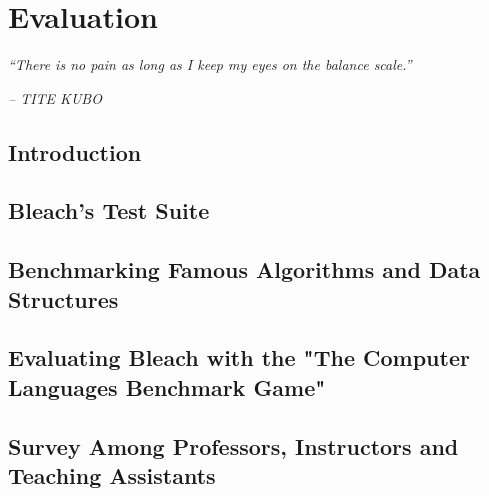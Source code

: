 \chapter{Evaluation} \label{cap:Resultados}

\begin{displayquote}
    \begin{center}
        \textit{``There is no pain as long as I keep my eyes on the balance scale.''}
    \end{center}
\end{displayquote}

\begin{flushright}
   \textit{-- TITE KUBO}
\end{flushright}

\section{Introduction}

\section{Bleach's Test Suite}

\section{Benchmarking Famous Algorithms and Data Structures}

\section{Evaluating Bleach with the "The Computer Languages Benchmark Game"}

\section{Survey Among Professors, Instructors and Teaching Assistants}